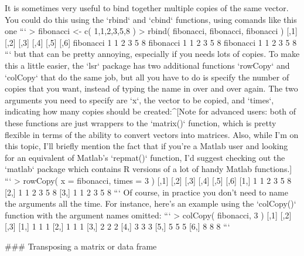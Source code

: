 It is sometimes very useful to bind together multiple copies of the same vector. You could do this using the `rbind` and `cbind` functions, using comands like this one
```
> fibonacci <- c( 1,1,2,3,5,8 )
> rbind( fibonacci, fibonacci, fibonacci )
          [,1] [,2] [,3] [,4] [,5] [,6]
fibonacci    1    1    2    3    5    8
fibonacci    1    1    2    3    5    8
fibonacci    1    1    2    3    5    8
```
but that can be pretty annoying, especially if you needs lots of copies. To make this a little easier, the `lsr` package has two additional functions `rowCopy` and `colCopy` that do the same job, but all you have to do is specify the number of copies that you want, instead of typing the name in over and over again. The two arguments you need to specify are `x`, the vector to be copied, and `times`, indicating how many copies should be created:^[Note for advanced users: both of these functions are just wrappers to the `matrix()` function, which is pretty flexible in terms of the ability to convert vectors into matrices. Also, while I'm on this topic, I'll briefly mention the fact that if you're a Matlab user and looking for an equivalent of Matlab's `repmat()` function, I'd suggest checking out the `matlab` package which contains R versions of a lot of handy Matlab functions.]
```
> rowCopy( x = fibonacci, times = 3 )
     [,1] [,2] [,3] [,4] [,5] [,6]
[1,]    1    1    2    3    5    8
[2,]    1    1    2    3    5    8
[3,]    1    1    2    3    5    8
```
Of course, in practice you don't need to name the arguments all the time. For instance, here's an example using the `colCopy()` function with the argument names omitted:
```
> colCopy( fibonacci, 3 )
     [,1] [,2] [,3]
[1,]    1    1    1
[2,]    1    1    1
[3,]    2    2    2
[4,]    3    3    3
[5,]    5    5    5
[6,]    8    8    8
```

### Transposing a matrix or data frame

